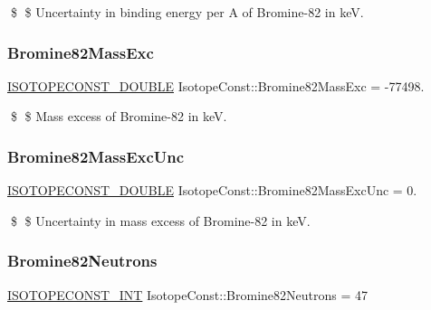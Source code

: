 \$ \$ Uncertainty in binding energy per A of Bromine-\/82 in keV. \mbox{\label{group___isotope_const-_bromine-_br82_ga3e931a76058eea38be6281faa97da324}} 
\subsubsection{\texorpdfstring{Bromine82\+Mass\+Exc}{Bromine82MassExc}}
{\footnotesize\ttfamily \mbox{\hyperlink{group___isotope_const-_macros_ga8f45a7272ce02c0b4c65c44636ed719a}{I\+S\+O\+T\+O\+P\+E\+C\+O\+N\+S\+T\+\_\+\+D\+O\+U\+B\+LE}} Isotope\+Const\+::\+Bromine82\+Mass\+Exc = -\/77498.}

\$ \$ Mass excess of Bromine-\/82 in keV. \mbox{\label{group___isotope_const-_bromine-_br82_ga6790fb2143c541915d5d367c8a6c18a7}} 
\subsubsection{\texorpdfstring{Bromine82\+Mass\+Exc\+Unc}{Bromine82MassExcUnc}}
{\footnotesize\ttfamily \mbox{\hyperlink{group___isotope_const-_macros_ga8f45a7272ce02c0b4c65c44636ed719a}{I\+S\+O\+T\+O\+P\+E\+C\+O\+N\+S\+T\+\_\+\+D\+O\+U\+B\+LE}} Isotope\+Const\+::\+Bromine82\+Mass\+Exc\+Unc = 0.}

\$ \$ Uncertainty in mass excess of Bromine-\/82 in keV. \mbox{\label{group___isotope_const-_bromine-_br82_gac9d29c12e1fab3d1722850a2e8eb13d1}} 
\subsubsection{\texorpdfstring{Bromine82\+Neutrons}{Bromine82Neutrons}}
{\footnotesize\ttfamily \mbox{\hyperlink{group___isotope_const-_macros_ga5f18360b3e99483a35c32d789e62621c}{I\+S\+O\+T\+O\+P\+E\+C\+O\+N\+S\+T\+\_\+\+I\+NT}} Isotope\+Const\+::\+Bromine82\+Neutrons = 47}

